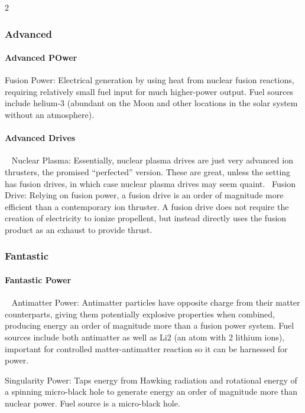 \begin{multicols}{2}
\subsubsection{Advanced}

\paragraph{Advanced POwer}

Fusion Power: Electrical generation by using heat from nuclear fusion reactions, requiring relatively small fuel input for much higher-power output. Fuel sources include helium-3 (abundant on the Moon and other locations in the solar system without an atmosphere). 

\paragraph{Advanced Drives}
 
Nuclear Plasma: Essentially, nuclear plasma drives are just very advanced ion thrusters, the promised “perfected” version. These are great, unless the setting has fusion drives, in which case nuclear plasma drives may seem quaint. 
Fusion Drive: Relying on fusion power, a fusion drive is an order of magnitude more efficient than a contemporary ion thruster. A fusion drive does not require the creation of electricity to ionize propellent, but instead directly uses the fusion product as an exhaust to provide thrust.

\subsubsection{Fantastic}

\paragraph{Fantastic Power}
 
Antimatter Power: Antimatter particles have opposite charge from their matter counterparts, giving them potentially explosive properties when combined, producing energy an order of magnitude more than a fusion power system. Fuel sources include both antimatter as well as Li2 (an atom with 2 lithium ions), important for controlled matter-antimatter reaction so it can be harnessed for power. 

Singularity Power: Taps energy from Hawking radiation and rotational energy of a spinning micro-black hole to generate energy an order of magnitude more than nuclear power. Fuel source is a micro-black hole. 


\end{multicols}
